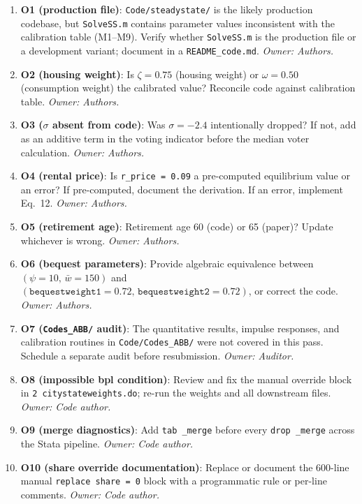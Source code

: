 \documentclass[11pt]{article}
\begin{document}
\begin{enumerate}
  \item \textbf{O1 (production file)}: \texttt{Code/steadystate/} is the
    likely production codebase, but \texttt{SolveSS.m} contains parameter values
    inconsistent with the calibration table (M1--M9). Verify whether
    \texttt{SolveSS.m} is the production file or a development variant;
    document in a \texttt{README\_code.md}. \textit{Owner: Authors.}

  \item \textbf{O2 (housing weight)}: Is $\zeta = 0.75$ (housing weight) or
    $\omega = 0.50$ (consumption weight) the calibrated value? Reconcile code
    against calibration table. \textit{Owner: Authors.}

  \item \textbf{O3 ($\sigma$ absent from code)}: Was $\sigma = -2.4$ intentionally
    dropped? If not, add as an additive term in the voting indicator before the
    median voter calculation. \textit{Owner: Authors.}

  \item \textbf{O4 (rental price)}: Is \texttt{r\_price = 0.09} a pre-computed
    equilibrium value or an error? If pre-computed, document the derivation.
    If an error, implement Eq.~12. \textit{Owner: Authors.}

  \item \textbf{O5 (retirement age)}: Retirement age 60 (code) or 65 (paper)?
    Update whichever is wrong. \textit{Owner: Authors.}

  \item \textbf{O6 (bequest parameters)}: Provide algebraic equivalence between
    $(\psi = 10,\, \bar{w} = 150)$ and $(\texttt{bequestweight1} = 0.72,\,
    \texttt{bequestweight2} = 0.72)$, or correct the code. \textit{Owner: Authors.}

  \item \textbf{O7 (\texttt{Codes\_ABB/} audit)}: The quantitative results,
    impulse responses, and calibration routines in \texttt{Code/Codes\_ABB/}
    were not covered in this pass. Schedule a separate audit before resubmission.
    \textit{Owner: Auditor.}

  \item \textbf{O8 (impossible bpl condition)}: Review and fix the manual override
    block in \texttt{2 citystateweights.do}; re-run the weights and all downstream
    files. \textit{Owner: Code author.}

  \item \textbf{O9 (merge diagnostics)}: Add \texttt{tab \_merge} before every
    \texttt{drop \_merge} across the Stata pipeline.
    \textit{Owner: Code author.}

  \item \textbf{O10 (share override documentation)}: Replace or document the
    600-line manual \texttt{replace share = 0} block with a programmatic rule
    or per-line comments. \textit{Owner: Code author.}
\end{enumerate}
\end{document}
